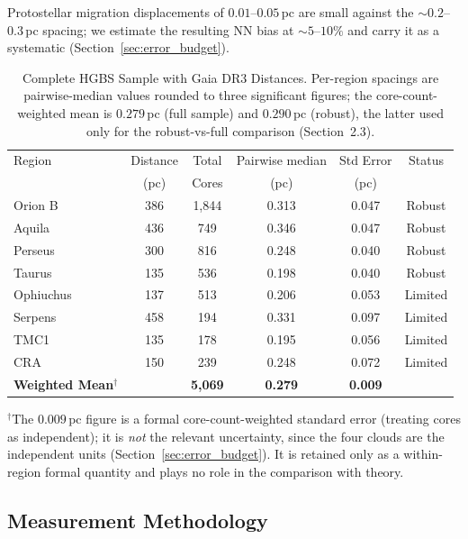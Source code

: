\documentclass[usenatbib,twoside,twocolumn]{mnras}
\begin{document}
Protostellar migration displacements of $0.01$--$0.05$\,pc \citep{Kirk2016, Mattern2018} are small against the $\sim0.2$--$0.3$\,pc spacing; we estimate the resulting NN bias at $\sim5$--$10\%$ and carry it as a systematic (Section~\ref{sec:error_budget}).

\begin{table}
\caption{Complete HGBS Sample with Gaia DR3 Distances. Per-region spacings are pairwise-median values rounded to three significant figures; the core-count-weighted mean is $0.279$\,pc (full sample) and $0.290$\,pc (robust), the latter used only for the robust-vs-full comparison (Section~2.3).}
\label{tab:sample}
\begin{tabular}{lccccc}
\toprule
Region & Distance & Total & Pairwise median & Std Error & Status \\
       & (pc)   & Cores & (pc)   & (pc)      &  \\
\midrule
Orion B  & 386 & 1,844 & 0.313 & 0.047 & Robust \\
Aquila   & 436 & 749   & 0.346 & 0.047 & Robust \\
Perseus  & 300 & 816   & 0.248 & 0.040 & Robust \\
Taurus   & 135 & 536   & 0.198 & 0.040 & Robust \\
Ophiuchus& 137 & 513   & 0.206 & 0.053 & Limited \\
Serpens  & 458 & 194   & 0.331 & 0.097 & Limited \\
TMC1     & 135 & 178   & 0.195 & 0.056 & Limited \\
CRA      & 150 & 239   & 0.248 & 0.072 & Limited \\
\midrule
\textbf{Weighted Mean}$^\dagger$ &  & \textbf{5,069} & \textbf{0.279} & \textbf{0.009} &  \\
\bottomrule
\end{tabular}
\par\vspace{2pt}
\footnotesize $^\dagger$The $0.009$\,pc figure is a formal core-count-weighted standard error (treating cores as independent); it is \emph{not} the relevant uncertainty, since the four clouds are the independent units (Section~\ref{sec:error_budget}). It is retained only as a within-region formal quantity and plays no role in the comparison with theory.
\end{table}

\subsection{Measurement Methodology}
\label{sec:methodology}
\end{document}
